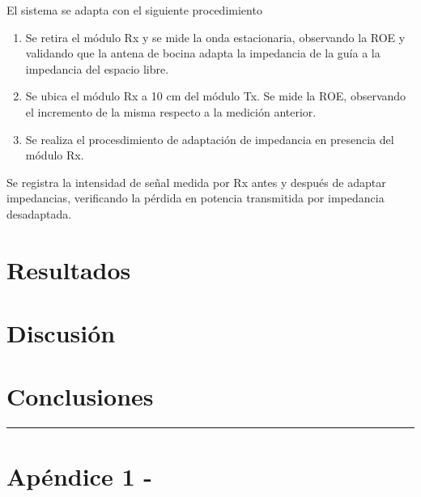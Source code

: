 \documentclass[11pt,a4paper]{article}
\begin{document}
\begin{multicols}{2}
El sistema se adapta con el siguiente procedimiento
\begin{enumerate}
    \item Se retira el módulo Rx y se mide la onda estacionaria, observando la ROE y validando que la antena de bocina adapta la impedancia de la guía a la impedancia del espacio libre.
    \item Se ubica el módulo Rx a 10 cm del módulo Tx. Se mide la ROE, observando el incremento de la misma respecto a la medición anterior.
    \item Se realiza el procesdimiento de adaptación de impedancia en presencia del módulo Rx.
\end{enumerate}

Se registra la intensidad de señal medida por Rx antes y después de adaptar impedancias, verificando la pérdida en potencia transmitida por impedancia desadaptada.

\section{Resultados}


\section{Discusión}

\section{Conclusiones}




\end{multicols}
\newpage
\begin{appendices}
\vspace{-1em}
\hrule
\vspace{1em}
\normalsize
\section{Apéndice 1 -}
\end{appendices}

\begin{multicols}{2}

\end{multicols}
\end{document}
